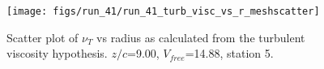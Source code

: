 \begin{figure}[H]
\centering
\texttt{[image: figs/run\_41/run\_41\_turb\_visc\_vs\_r\_meshscatter]}
\caption{Scatter plot of $\nu_T$ vs radius as calculated from the turbulent viscosity hypothesis. $z/c$=9.00, $V_{free}$=14.88, station 5.}
\label{fig:run_41_turb_visc_vs_r_meshscatter}
\end{figure}


